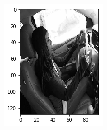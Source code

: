 \documentclass[12pt, letterpaper]{article}
\begin{document}
\begin{figure}[H]
    \centering
    \begin{subfigure}[b]{0.3\textwidth}
        \includegraphics[width=\textwidth]{ae-img2}
        \label{fig:gull}
    \end{subfigure}
    ~ %
    \begin{subfigure}[b]{0.3\textwidth}

\end{subfigure}
\end{figure}
\end{document}
